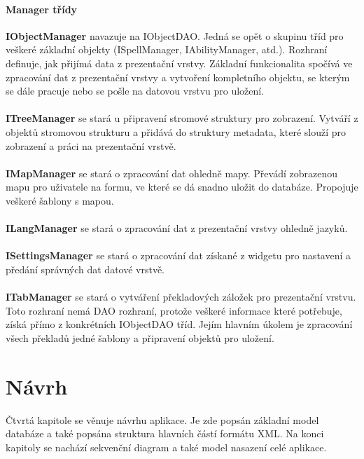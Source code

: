 \documentclass[thesis=B,czech]{resources/FITthesis}[2012/06/26]
\begin{document}
\subsubsection*{Manager třídy}
\textbf{IObjectManager} navazuje na IObjectDAO. Jedná se opět o skupinu tříd pro veškeré základní objekty (ISpellManager, IAbilityManager, atd.). Rozhraní definuje, jak přijímá data z prezentační vrstvy. Základní funkcionalita spočívá ve zpracování dat z prezentační vrstvy a vytvoření kompletního objektu, se kterým se dále pracuje nebo se pošle na datovou vrstvu pro uložení.\\
\\
\noindent\textbf{ITreeManager} se stará u připravení stromové struktury pro zobrazení. Vytváří z objektů stromovou strukturu a přidává do struktury metadata, které slouží pro zobrazení a práci na prezentační vrstvě.\\
\\
\textbf{IMapManager} se stará o zpracování dat ohledně mapy. Převádí zobrazenou mapu pro uživatele na formu, ve které se dá snadno uložit do databáze. Propojuje veškeré šablony s mapou.\\
\\
\textbf{ILangManager} se stará o zpracování dat z prezentační vrstvy ohledně jazyků.\\
\\
\textbf{ISettingsManager} se stará o zpracování dat získané z widgetu pro nastavení a předání správných dat datové vrstvě.\\
\\
\textbf{ITabManager} se stará o vytváření překladových záložek pro prezentační vrstvu. Toto rozhraní nemá DAO rozhraní, protože veškeré informace které potřebuje, získá přímo z konkrétních IObjectDAO tříd. Jejím hlavním úkolem je zpracování všech překladů jedné šablony a připravení objektů pro uložení.\\





\chapter{Návrh}
Čtvrtá kapitole se věnuje návrhu aplikace. Je zde popsán základní model databáze a také popsána struktura hlavních částí formátu XML. Na konci kapitoly se nachází sekvenční diagram a také model nasazení celé aplikace. 
\end{document}

